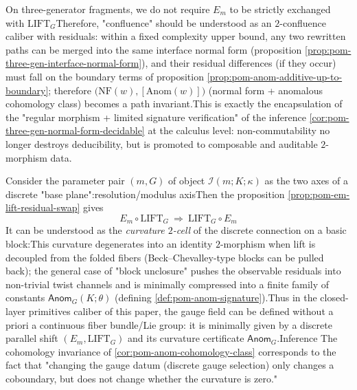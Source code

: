 \begin{remark} \label{rem:pom-residual-2confluence}On three-generator fragments, we do not require \(E_m\) to be {strictly} exchanged with \(\mathrm{LIFT}_G\)Therefore, "confluence" should be understood as an \(2\)-confluence caliber with residuals: within a fixed complexity upper bound, any two rewritten paths can be merged into the same interface normal form (proposition \ref{prop:pom-three-gen-interface-normal-form}), and their residual differences (if they occur) must fall on the boundary terms of proposition \ref{prop:pom-anom-additive-up-to-boundary}; therefore \(\bigl(\mathrm{NF}(w),[\mathrm{Anom}(w)]\bigr)\) (normal form + anomalous cohomology class) becomes a path invariant.This is exactly the encapsulation of the "regular morphism + limited signature verification" of the inference \ref{cor:pom-three-gen-normal-form-decidable} at the calculus level: non-commutability no longer destroys deducibility, but is promoted to composable and auditable \(2\)-morphism data.\end{remark}

\begin{remark}\label{rem:pom-anom-as-curvature}Consider the parameter pair \((m,G)\) of object \(\mathcal{I}(m;K;\kappa)\) as the two axes of a discrete "base plane":resolution/modulus axisThen the proposition \ref{prop:pom-em-lift-residual-swap} gives\[
E_m\circ \mathrm{LIFT}_G\ \Rightarrow\ \mathrm{LIFT}_G\circ E_m
\]
It can be understood as the \emph {curvature \(2\)-cell} of the discrete connection on a basic block:This curvature degenerates into an identity \(2\)-morphism when lift is decoupled from the folded fibers (Beck--Chevalley-type blocks can be pulled back); the general case of "block unclosure" pushes the observable residuals into non-trivial twist channels and is minimally compressed into a finite family of constants \(\mathsf{Anom}_G(K;\theta)\) (defining \ref{def:pom-anom-signature}).Thus in the closed-layer primitives caliber of this paper, the gauge field can be defined without a priori a continuous fiber bundle/Lie group: it is minimally given by a discrete parallel shift \((E_m,\mathrm{LIFT}_G)\) and its curvature certificate \(\mathsf{Anom}_G\).Inference The cohomology invariance of \ref{cor:pom-anom-cohomology-class} corresponds to the fact that "changing the gauge datum (discrete gauge selection) only changes a coboundary, but does not change whether the curvature is zero."\end{remark}

